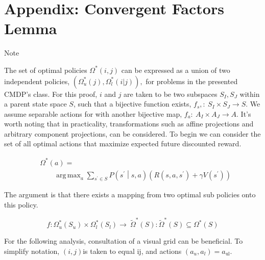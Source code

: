 \documentclass[compsoc,journal,letterpaper,10pt,draftcls,twocolumn]{IEEEtran}
\DeclareMathOperator*{\argmax}{arg\,max}
\begin{document}
\section{Appendix: Convergent Factors
Lemma}\label{appendix-convergent-factors-lemma}

Note

The set of optimal policies \(\Omega_{\ }^{*}\left( i,j \right)\) can be
expressed as a union of two independent policies,
\(\left( \Omega_{u}^{*}\left( j \right),\Omega_{l}^{*}\left( i|j \right) \right),\)
for problems in the presented CMDP's class. For this proof, \(i\) and
\(j\) are taken to be two subspaces \(S_{I},S_{J}\) within a parent
state space \(S\), such that a bijective function exists,
\(f_{s},:\ S_{I} \times S_{J} \rightarrow S.\) We assume separable
actions for with another bijective map,
\(f_{a}:\ A_{I} \times A_{J} \rightarrow A\). It's worth noting that in
practicality, transformations such as affine projections and arbitrary
component projections, can be considered. To begin we can consider the
set of all optimal actions that maximize expected future discounted
reward.

 
\begin{align}
& \Omega^{\ast}(a) = \nonumber \\ & \qquad \argmax_{a}\sum_{s^\prime \in S}{P\left( s^\prime\middle|s,a \right)\left( R\left( s,a,s^\prime \right) + \gamma V\left( s^\prime \right) \right)}
\end{align}
 
The argument is that there exists a mapping from two optimal sub
policies onto this policy.

\begin{equation} 
f:\Omega_{u}^{\ast}\left( S_{u} \right) \times \Omega_{l}^{\ast}\left( S_{l} \right) \rightarrow \ {\tilde{\Omega}}^{\ast}\left( S \right):{\tilde{\Omega}}^{\ast}\left( S \right) \subseteq \Omega^{\ast}\left( S \right)
\end{equation}

For the following analysis, consultation of a visual grid can be
beneficial. To simplify notation, \(\left( i, j \right)\)is taken to
equal \(\text{ij}\), and actions
\(\left( a_{u},a_{l} \right) = a_{\text{ul}}\).
\end{document}
